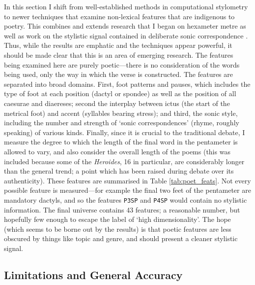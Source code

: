 \documentclass[twocolumn, switch, a4paper]{article} %
\begin{document}
In this section I shift from well-established methods in computational
stylometry to newer techniques that examine non-lexical features that are
indigenous to poetry. This combines and extends research that I began on
hexameter metre \cite{nagy2021metre} as well as work on the stylistic signal
contained in deliberate sonic correspondence \cite{nagy_rhyme_2022}. Thus,
while the results are emphatic and the techniques appear powerful, it should
be made clear that this is an area of emerging research. The features being
examined here are purely poetic---there is no consideration of the words being
used, only the way in which the verse is constructed. The features are
separated into broad domains. First, foot patterns and pauses, which includes
the type of foot at each position (dactyl or spondee) as well as the position
of all caesurae and diaereses; second the interplay between ictus (the start
of the metrical foot) and accent (syllables bearing stress); and third, the
sonic style, including the number and strength of `sonic correspondences'
(rhyme, roughly speaking) of various kinds. Finally, since it is crucial to
the traditional debate, I measure the degree to which the length of the final
word in the pentameter is allowed to vary, and also consider the overall
length of the poems (this was included because some of the \emph{Heroides}, 16
in particular, are considerably longer than the general trend; a point which
has been raised during debate over its authenticity). These features are
summarised in Table \ref{tab:poet_feats}. Not every possible feature is
measured---for example the final two feet of the pentameter are mandatory
dactyls, and so the features \texttt{P3SP} and \texttt{P4SP} would contain no
stylistic information. The final universe contains 43 features; a reasonable
number, but hopefully few enough to escape the label of `high dimensionality'.
The hope (which seems to be borne out by the results) is that poetic features
are less obscured by things like topic and genre, and should present a cleaner
stylistic signal.

\subsection{Limitations and General Accuracy}
\end{document}
